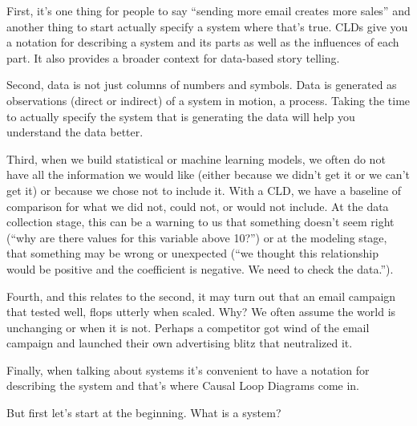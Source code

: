 \documentclass[letterpaper,10pt,english]{sphinxmanual}
\begin{document}
First, it’s one thing for people to say “sending more email creates more sales” and another thing to start actually specify a system where that’s true. CLDs give you a notation for describing a system and its parts as well as the influences of each part. It also provides a broader context for data-based story telling.

Second, data is not just columns of numbers and symbols. Data is generated as observations (direct or indirect) of a system in motion, a process. Taking the time to actually specify the system that is generating the data will help you understand the data better.

Third, when we build statistical or machine learning models, we often do not have all the information we would like (either because we didn’t get it or we can’t get it) or because we chose not to include it. With a CLD, we have a baseline of comparison for what we did not, could not, or would not include. At the data collection stage, this can be a warning to us that something doesn’t seem right (“why are there values for this variable above 10?”) or at the modeling stage, that something may be
wrong or unexpected (“we thought this relationship would be positive and the coefficient is negative. We need to check the data.”).

Fourth, and this relates to the second, it may turn out that an email campaign that tested well, flops utterly when scaled. Why? We often assume the world is unchanging or  when it is not. Perhaps a competitor got wind of the email campaign and launched their own advertising blitz that neutralized it.

Finally, when talking about systems it’s convenient to have a notation for describing the system and that’s where Causal Loop Diagrams come in.

But first let’s start at the beginning. What is a system?
\end{document}
